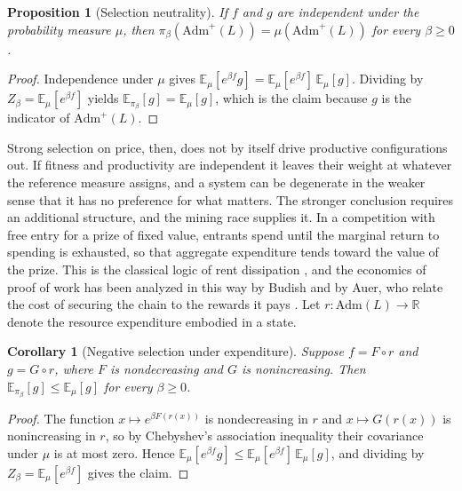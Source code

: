\documentclass[11pt]{article}
\newtheorem{proposition}{Proposition}
\newtheorem{corollary}{Corollary}
\theoremstyle{remark}
\newcommand{\Adm}{\mathrm{Adm}}
\newcommand{\E}{\mathbb{E}}
\begin{document}
\begin{proposition}[Selection neutrality]\label{prop:neutral}
If $f$ and $g$ are independent under the probability measure $\mu$, then $\pi_\beta(\Adm^{+}(L))=\mu(\Adm^{+}(L))$ for every $\beta\ge 0$.
\end{proposition}

\begin{proof}
Independence under $\mu$ gives $\E_\mu[e^{\beta f}g]=\E_\mu[e^{\beta f}]\,\E_\mu[g]$. Dividing by $Z_\beta=\E_\mu[e^{\beta f}]$ yields $\E_{\pi_\beta}[g]=\E_\mu[g]$, which is the claim because $g$ is the indicator of $\Adm^{+}(L)$.
\end{proof}

Strong selection on price, then, does not by itself drive productive configurations out. If fitness and productivity are independent it leaves their weight at whatever the reference measure assigns, and a system can be degenerate in the weaker sense that it has no preference for what matters. The stronger conclusion requires an additional structure, and the mining race supplies it. In a competition with free entry for a prize of fixed value, entrants spend until the marginal return to spending is exhausted, so that aggregate expenditure tends toward the value of the prize. This is the classical logic of rent dissipation \cite{tullock1967,posner1975}, and the economics of proof of work has been analyzed in this way by Budish and by Auer, who relate the cost of securing the chain to the rewards it pays \cite{budish2018,auer2019}. Let $r:\Adm(L)\to\mathbb R$ denote the resource expenditure embodied in a state.

\begin{corollary}[Negative selection under expenditure]\label{cor:negative}
Suppose $f=F\circ r$ and $g=G\circ r$, where $F$ is nondecreasing and $G$ is nonincreasing. Then $\E_{\pi_\beta}[g]\le \E_\mu[g]$ for every $\beta\ge 0$.
\end{corollary}

\begin{proof}
The function $x\mapsto e^{\beta F(r(x))}$ is nondecreasing in $r$ and $x\mapsto G(r(x))$ is nonincreasing in $r$, so by Chebyshev's association inequality their covariance under $\mu$ is at most zero. Hence $\E_\mu[e^{\beta f}g]\le \E_\mu[e^{\beta f}]\,\E_\mu[g]$, and dividing by $Z_\beta=\E_\mu[e^{\beta f}]$ gives the claim.
\end{proof}
\end{document}
